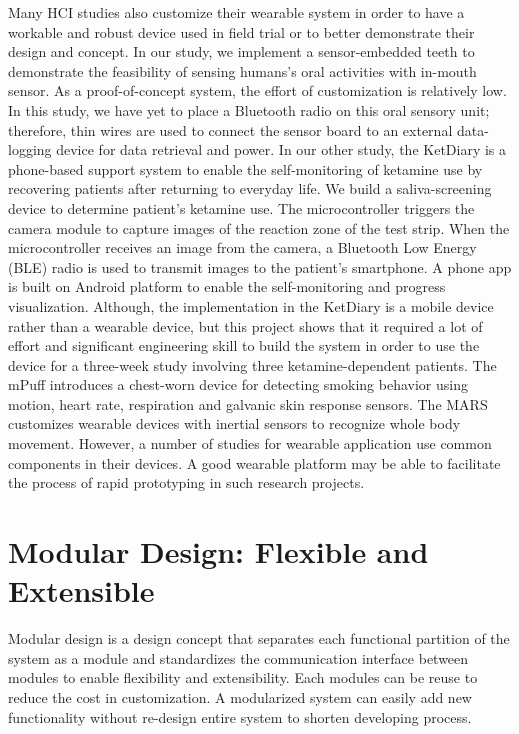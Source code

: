 Many HCI studies also customize their wearable system in order to have a workable and robust device used in field trial or to better demonstrate their design and concept.
In our study, we implement a sensor-embedded teeth\cite{Li2013teeth} to demonstrate the feasibility of sensing humans's oral activities with in-mouth sensor. As a proof-of-concept system, the effort of customization is relatively low. In this study, we have yet to place a Bluetooth radio on this oral sensory unit; therefore, thin wires are used to connect the sensor board to an external data-logging device for data retrieval and power. 
In our other study, the KetDiary\cite{You2016Ket} is a phone-based support system to enable the self-monitoring of ketamine use by recovering patients after returning to everyday life. 
We build a saliva-screening device to determine patient's ketamine use.
The microcontroller triggers the camera module to capture images of the reaction zone of the test strip. When the microcontroller receives an image from the camera, a Bluetooth Low Energy (BLE) radio is used to transmit images to the patient’s smartphone. 
A phone app is built on Android platform to enable the self-monitoring and progress visualization. 
Although, the implementation in the KetDiary is a mobile device rather than a wearable device, but this project shows that it required a lot of effort and significant engineering skill to build the system in order to use the device for a three-week study involving three ketamine-dependent patients.
The mPuff\cite{mPuff:2012:MAD:2185677.2185741} introduces a chest-worn device for detecting smoking behavior using motion, heart rate, respiration and galvanic skin response sensors.
The MARS\cite{Mokaya:2013:MMA:2461381.2461406} customizes wearable devices with inertial sensors to recognize whole body movement.
However, a number of studies for wearable application\cite{mPuff:2012:MAD:2185677.2185741, Lane:2015:ZCD:2742647.2742672, Mokaya:2013:MMA:2461381.2461406, Thompson:2015:DHA:2750858.2807536, Mokaya:2015:MVB:2750858.2804258, Lorincz:2009:MWS:1644038.1644057, Yatani:2012:BWA:2370216.2370269} use common components in their devices. A good wearable platform may be able to facilitate the process of rapid prototyping in such research projects.

\section{Modular Design: Flexible and Extensible}
Modular design is a design concept that separates each functional partition of the system as a module and standardizes the communication interface between modules to enable flexibility and extensibility.
Each modules can be reuse to reduce the cost in customization. A modularized system can easily add new functionality without re-design entire system to shorten developing process.

